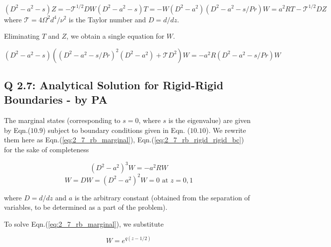 \documentclass{article}
\begin{document}
\begin{subequations}\label{eq:2_3_amplitude}
 \begin{equation}
  (D^{2}-a^{2}-s)Z = -\mathcal{T}^{1/2}DW
 \end{equation}
 
 \begin{equation}
  (D^{2}-a^{2}-s) T = -W
 \end{equation}
 
 \begin{equation}
  (D^{2}-a^{2})(D^{2}-a^{2}-s/Pr)W = a^{2}RT - \mathcal{T}^{1/2}DZ
 \end{equation}
\end{subequations}
where $\mathcal{T} = 4\Omega^{2}d^{4}/\nu^{2}$ is the Taylor number and $D = d/dz$.

Eliminating $T$ and $Z$, we obtain a single equation for $W$.

\begin{equation}
 (D^{2}-a^{2}-s)\left( (D^{2}-a^{2}-s/Pr)^{2}(D^{2}-a^{2}) + \mathcal{T}D^{2}\right)W = -a^{2}R (D^{2}-a^{2}-s/Pr)W
\end{equation}

\subsection{Q 2.7: Analytical Solution for Rigid-Rigid Boundaries - by PA}
The marginal states (corresponding to $s=0$, where $s$ is the eigenvalue) are given by Eqn.($10.9$) subject to boundary conditions given in Eqn. ($10.10$). We rewrite them here as Eqn.(\ref{eq:2_7_rb_marginal}), Eqn.(\ref{eq:2_7_rb_rigid_rigid_bc}) for the sake of completeness 

\begin{equation}\label{eq:2_7_rb_marginal}
 (D^{2}-a^{2})^{3} W = - a^{2} R W
\end{equation}
\begin{equation}\label{eq:2_7_rb_rigid_rigid_bc}
 W = DW = (D^{2}-a^{2})^{2} W = 0 \textrm{ at } z = 0, 1
\end{equation}

where $D = d/dz$ and $a$ is the arbitrary constant (obtained from the separation of variables, to be determined as a part of the problem). 

To solve Eqn.(\ref{eq:2_7_rb_marginal}), we substitute 

\begin{equation}\label{eq:2_7_W_ansatz}
W = e^{q(z-1/2)}  
\end{equation}
\end{document}
